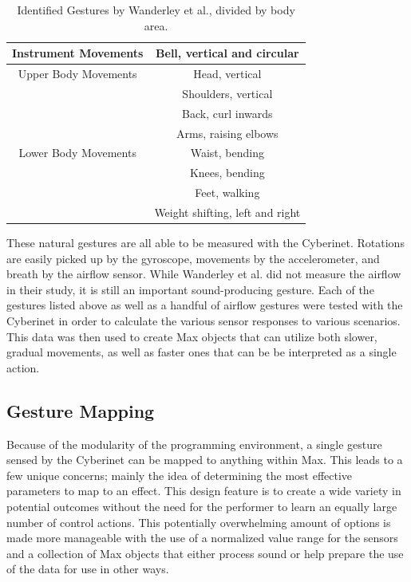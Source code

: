 \begin{table}[]
    \centering
    \begin{tabular}{|c||c|}
    \hline
       Instrument Movements  & Bell, vertical and circular \\
       \hline
        Upper Body Movements & Head, vertical \\
        & Shoulders, vertical \\
        & Back, curl inwards \\
        & Arms, raising elbows \\
        \hline
        Lower Body Movements & Waist, bending \\
        & Knees, bending \\
        & Feet, walking \\
        & Weight shifting, left and right\\
        \hline
    \end{tabular}
    \caption{Identified Gestures by Wanderley et al.\cite{wanderleyClarinetGesture2005}, divided by body area.}
    \label{tab:generalGestures}
\end{table}

These natural gestures are all able to be measured with the Cyberinet. Rotations are easily picked up by the gyroscope, movements by the accelerometer, and breath by the airflow sensor. While Wanderley et al. did not measure the airflow in their study, it is still an important sound-producing gesture\cite{miranda_Wanderley_instrumentControl_2006}. Each of the gestures listed above as well as a handful of airflow gestures were tested with the Cyberinet in order to calculate the various sensor responses to various scenarios. This data was then used to create Max objects that can utilize both slower, gradual movements, as well as faster ones that can be be interpreted as a single action.


\subsection{Gesture Mapping}

Because of the modularity of the programming environment, a single gesture sensed by the Cyberinet can be mapped to anything within Max. This leads to a few unique concerns; mainly the idea of determining the most effective parameters to map to an effect. This design feature is to create a wide variety in potential outcomes without the need for the performer to learn an equally large number of control actions. This potentially overwhelming amount of options is made more manageable with the use of a normalized value range for the sensors and a collection of Max objects that either process sound or help prepare the use of the data for use in other ways. 

